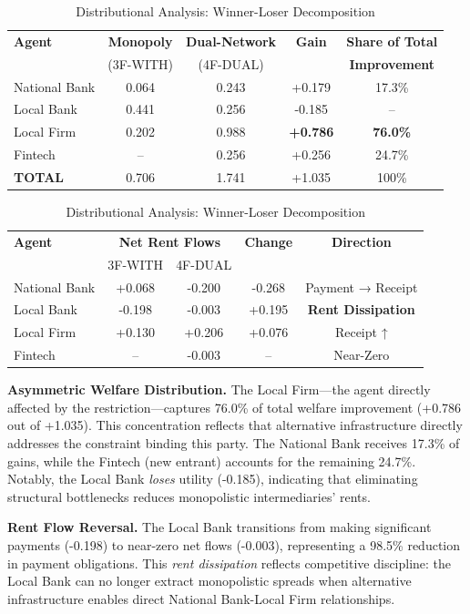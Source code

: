 \documentclass[12pt]{article}
\begin{document}
\begin{table}[h]
\centering
\caption{Distributional Analysis: Winner-Loser Decomposition}
\label{tab:distributional_analysis}
\begin{tabular}{lcccc}
\toprule
\textbf{Agent} & \textbf{Monopoly} & \textbf{Dual-Network} & \textbf{Gain} & \textbf{Share of Total} \\
 & (3F-WITH) & (4F-DUAL) & & \textbf{Improvement} \\
\midrule
National Bank & 0.064 & 0.243 & +0.179 & 17.3\% \\
Local Bank & 0.441 & 0.256 & -0.185 & -- \\
Local Firm & 0.202 & 0.988 & \textbf{+0.786} & \textbf{76.0\%} \\
Fintech & -- & 0.256 & +0.256 & 24.7\% \\
\midrule
\textbf{TOTAL} & 0.706 & 1.741 & +1.035 & 100\% \\
\bottomrule
\end{tabular}

\medskip

\begin{tabular}{lcccc}
\toprule
\textbf{Agent} & \multicolumn{2}{c}{\textbf{Net Rent Flows}} & \textbf{Change} & \textbf{Direction} \\
 & 3F-WITH & 4F-DUAL & & \\
\midrule
National Bank & +0.068 & -0.200 & -0.268 & Payment → Receipt \\
Local Bank & -0.198 & -0.003 & +0.195 & \textbf{Rent Dissipation} \\
Local Firm & +0.130 & +0.206 & +0.076 & Receipt ↑ \\
Fintech & -- & -0.003 & -- & Near-Zero \\
\bottomrule
\end{tabular}
\end{table}

\textbf{Asymmetric Welfare Distribution.} The Local Firm---the agent directly affected by the restriction---captures 76.0\% of total welfare improvement (+0.786 out of +1.035). This concentration reflects that alternative infrastructure directly addresses the constraint binding this party. The National Bank receives 17.3\% of gains, while the Fintech (new entrant) accounts for the remaining 24.7\%. Notably, the Local Bank \textit{loses} utility (-0.185), indicating that eliminating structural bottlenecks reduces monopolistic intermediaries' rents.

\textbf{Rent Flow Reversal.} The Local Bank transitions from making significant payments (-0.198) to near-zero net flows (-0.003), representing a 98.5\% reduction in payment obligations. This \textit{rent dissipation} reflects competitive discipline: the Local Bank can no longer extract monopolistic spreads when alternative infrastructure enables direct National Bank-Local Firm relationships.
\end{document}
